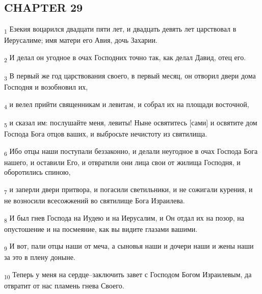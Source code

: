 \subsection{CHAPTER 29}
\begin{tcolorbox}
\textsubscript{1} Езекия воцарился двадцати пяти лет, и двадцать девять лет царствовал в Иерусалиме; имя матери его Авия, дочь Захарии.
\end{tcolorbox}
\begin{tcolorbox}
\textsubscript{2} И делал он угодное в очах Господних точно так, как делал Давид, отец его.
\end{tcolorbox}
\begin{tcolorbox}
\textsubscript{3} В первый же год царствования своего, в первый месяц, он отворил двери дома Господня и возобновил их,
\end{tcolorbox}
\begin{tcolorbox}
\textsubscript{4} и велел прийти священникам и левитам, и собрал их на площади восточной,
\end{tcolorbox}
\begin{tcolorbox}
\textsubscript{5} и сказал им: послушайте меня, левиты! Ныне освятитесь [сами] и освятите дом Господа Бога отцов ваших, и выбросьте нечистоту из святилища.
\end{tcolorbox}
\begin{tcolorbox}
\textsubscript{6} Ибо отцы наши поступали беззаконно, и делали неугодное в очах Господа Бога нашего, и оставили Его, и отвратили они лица свои от жилища Господня, и оборотились спиною,
\end{tcolorbox}
\begin{tcolorbox}
\textsubscript{7} и заперли двери притвора, и погасили светильники, и не сожигали курения, и не возносили всесожжений во святилище Бога Израилева.
\end{tcolorbox}
\begin{tcolorbox}
\textsubscript{8} И был гнев Господа на Иудею и на Иерусалим, и Он отдал их на позор, на опустошение и на посмеяние, как вы видите глазами вашими.
\end{tcolorbox}
\begin{tcolorbox}
\textsubscript{9} И вот, пали отцы наши от меча, а сыновья наши и дочери наши и жены наши за это в плену доныне.
\end{tcolorbox}
\begin{tcolorbox}
\textsubscript{10} Теперь у меня на сердце--заключить завет с Господом Богом Израилевым, да отвратит от нас пламень гнева Своего.
\end{tcolorbox}
